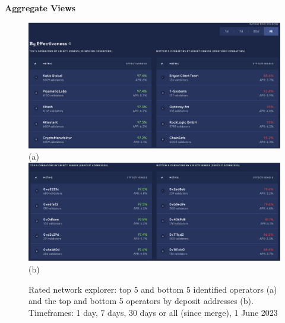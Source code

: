 \documentclass[UTF8]{article}
\begin{document}
{\textbf{Aggregate Views} 
\begin{figure}[htbp]
\begin{center}
\includegraphics[width=\linewidth]{images/ratedtrend1}\\
(a)
\includegraphics[width=\linewidth]{images/ratedtrend2}\\
(b)
\caption{Rated network explorer: top 5 and bottom 5 identified operators (a) and the top and bottom 5 operators by deposit addresses (b). Timeframes: 1 day, 7 days, 30 days or all (since merge), 1 June 2023}
\label{fig:ratedtrend1}
\end{center}
\end{figure}

}
\end{document}
